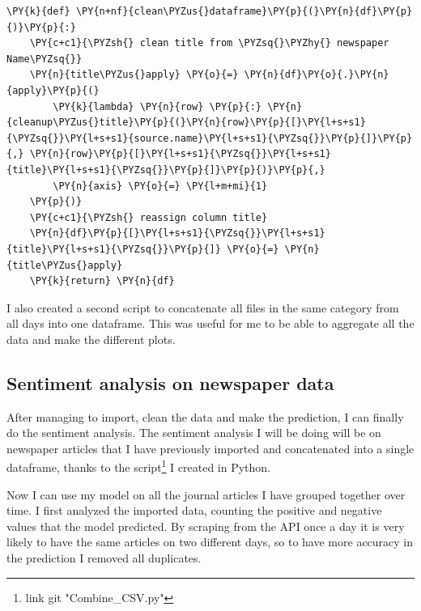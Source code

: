     \begin{tcolorbox}[breakable, size=fbox, boxrule=1pt, pad at break*=1mm,colback=cellbackground, colframe=cellborder]
\begin{Verbatim}[commandchars=\\\{\},fontsize=\footnotesize]
\PY{k}{def} \PY{n+nf}{clean\PYZus{}dataframe}\PY{p}{(}\PY{n}{df}\PY{p}{)}\PY{p}{:}
    \PY{c+c1}{\PYZsh{} clean title from \PYZsq{}\PYZhy{} newspaper Name\PYZsq{}}
    \PY{n}{title\PYZus{}apply} \PY{o}{=} \PY{n}{df}\PY{o}{.}\PY{n}{apply}\PY{p}{(}
        \PY{k}{lambda} \PY{n}{row} \PY{p}{:} \PY{n}{cleanup\PYZus{}title}\PY{p}{(}\PY{n}{row}\PY{p}{[}\PY{l+s+s1}{\PYZsq{}}\PY{l+s+s1}{source.name}\PY{l+s+s1}{\PYZsq{}}\PY{p}{]}\PY{p}{,} \PY{n}{row}\PY{p}{[}\PY{l+s+s1}{\PYZsq{}}\PY{l+s+s1}{title}\PY{l+s+s1}{\PYZsq{}}\PY{p}{]}\PY{p}{)}\PY{p}{,}
        \PY{n}{axis} \PY{o}{=} \PY{l+m+mi}{1}
    \PY{p}{)}
    \PY{c+c1}{\PYZsh{} reassign column title}
    \PY{n}{df}\PY{p}{[}\PY{l+s+s1}{\PYZsq{}}\PY{l+s+s1}{title}\PY{l+s+s1}{\PYZsq{}}\PY{p}{]} \PY{o}{=} \PY{n}{title\PYZus{}apply}
    \PY{k}{return} \PY{n}{df}
\end{Verbatim}
\end{tcolorbox}

I also created a second script to concatenate all files in the same category from all days into one dataframe.
This was useful for me to be able to aggregate all the data and make the different plots. 

\subsection{Sentiment analysis on newspaper data}
\label{chap:model plot}
After managing to import, clean the data and make the prediction, I can finally do the sentiment analysis.
The sentiment analysis I will be doing will be on newspaper articles that I have previously imported and concatenated into a single dataframe, thanks to the script\footnote{link git "Combine\_CSV.py"} I created in Python.

Now I can use my model on all the journal articles I have grouped together over time. 
I first analyzed the imported data, counting the positive and negative values that the model predicted.
By scraping from the API once a day it is very likely to have the same articles on two different days, so to have more accuracy in the prediction I removed all duplicates.

